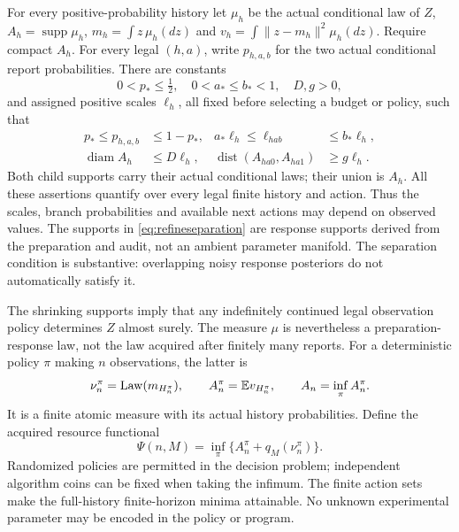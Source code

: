 For every positive-probability history let $\mu_h$ be the actual conditional law of $Z$, $A_h=\operatorname{supp}\mu_h$, $m_h=\int z\,\mu_h(dz)$ and $v_h=\int\|z-m_h\|^2\mu_h(dz)$. Require compact $A_h$. For every legal $(h,a)$, write $p_{h,a,b}$ for the two actual conditional report probabilities. There are constants
\begin{equation}\label{eq:refineconstants}
 0<p_*\le\tfrac12,\quad 0<a_*\le b_*<1,\quad D,g>0,
\end{equation}
and assigned positive scales $\ell_h$, all fixed before selecting a budget or policy, such that
\begin{align}
 p_*\le p_{h,a,b}&\le1-p_*,&
 a_*\ell_h\le\ell_{hab}&\le b_*\ell_h,\label{eq:refinemass}\\
 \operatorname{diam} A_h&\le D\ell_h,&
 \operatorname{dist}(A_{ha0},A_{ha1})&\ge g\ell_h.\label{eq:refineseparation}
\end{align}
Both child supports carry their actual conditional laws; their union is $A_h$. All these assertions quantify over every legal finite history and action. Thus the scales, branch probabilities and available next actions may depend on observed values. The supports in \eqref{eq:refineseparation} are response supports derived from the preparation and audit, not an ambient parameter manifold. The separation condition is substantive: overlapping noisy response posteriors do not automatically satisfy it.

The shrinking supports imply that any indefinitely continued legal observation policy determines $Z$ almost surely. The measure $\mu$ is nevertheless a preparation-response law, not the law acquired after finitely many reports. For a deterministic policy $\pi$ making $n$ observations, the latter is
\begin{equation}\label{eq:actualrefinedlaw}
 \nu_n^\pi=\operatorname{Law}(m_{H_n^\pi}),\qquad
 A_n^\pi=\mathbb E v_{H_n^\pi},\qquad A_n=\inf_\pi A_n^\pi.
\end{equation}
It is a finite atomic measure with its actual history probabilities. Define the acquired resource functional
\begin{equation}\label{eq:acquiredfunctional}
 \Psi(n,M)=\inf_\pi\{A_n^\pi+q_M(\nu_n^\pi)\}.
\end{equation}
Randomized policies are permitted in the decision problem; independent algorithm coins can be fixed when taking the infimum. The finite action sets make the full-history finite-horizon minima attainable. No unknown experimental parameter may be encoded in the policy or program.

